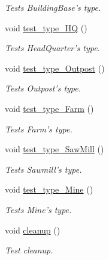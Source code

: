 \begin{DoxyCompactItemize}
\begin{DoxyCompactList}\small\item\em Tests Building\-Base's type. \end{DoxyCompactList}\item 
void \hyperlink{classdefault__building_a61e0dccb6b2d2f6caa6d5cb9d6f46761}{test\-\_\-type\-\_\-\-H\-Q} ()
\begin{DoxyCompactList}\small\item\em Tests Head\-Quarter's type. \end{DoxyCompactList}\item 
void \hyperlink{classdefault__building_afb2454e44d8d42562191c5c4cd81b6f7}{test\-\_\-type\-\_\-\-Outpost} ()
\begin{DoxyCompactList}\small\item\em Tests Outpost's type. \end{DoxyCompactList}\item 
void \hyperlink{classdefault__building_a024dda6691de09c78cd2c41c3b2517bb}{test\-\_\-type\-\_\-\-Farm} ()
\begin{DoxyCompactList}\small\item\em Tests Farm's type. \end{DoxyCompactList}\item 
void \hyperlink{classdefault__building_a2629b8493420e49f7d1bffc7c1f085fb}{test\-\_\-type\-\_\-\-Saw\-Mill} ()
\begin{DoxyCompactList}\small\item\em Tests Sawmill's type. \end{DoxyCompactList}\item 
void \hyperlink{classdefault__building_ab331bdbdb301645ece2f9942e5d0b1f4}{test\-\_\-type\-\_\-\-Mine} ()
\begin{DoxyCompactList}\small\item\em Tests Mine's type. \end{DoxyCompactList}\item 
void \hyperlink{classdefault__building_a35e2d98e0d70dd54f04a338c5cf923ae}{cleanup} ()
\begin{DoxyCompactList}\small\item\em Test cleanup. \end{DoxyCompactList}\end{DoxyCompactItemize}
